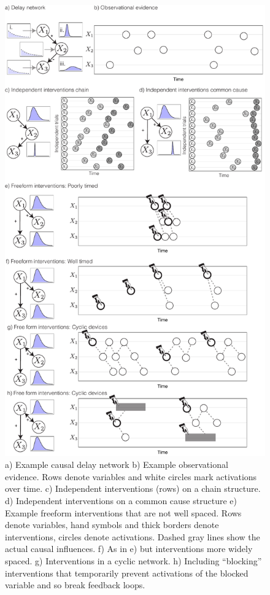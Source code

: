 \documentclass{cambridge7A}%
\begin{document}
\begin{figure}[t]
   \centering
   \includegraphics[width = .6\columnwidth]{DN}
   \caption{a) Example causal delay network %
   b) Example observational evidence.  Rows denote variables and white circles mark activations over time.  c) Independent interventions (rows) on a chain structure. %
   d) Independent interventions on a common cause structure%
   e) Example freeform interventions that are not well spaced.   Rows denote variables, hand symbols and thick borders denote interventions, circles denote activations.  Dashed gray lines show the actual causal influences.  f) As in e) but interventions more widely spaced.  g) Interventions in a cyclic network. h) Including ``blocking'' interventions that temporarily prevent activations of the blocked variable and so break feedback loops.}
   \label{fig:DN}
\end{figure}
\end{document}
